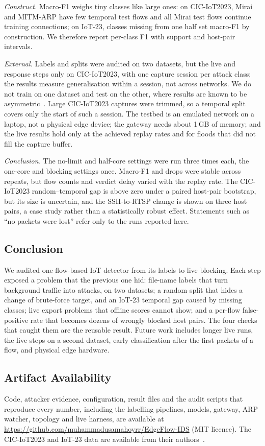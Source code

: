 \emph{Construct.} Macro-F1 weighs tiny classes like large ones: on CIC-IoT2023, Mirai and MITM-ARP have few temporal test flows and all Mirai test flows continue training connections; on IoT-23, classes missing from one half set macro-F1 by construction. We therefore report per-class F1 with support and host-pair intervals.

\emph{External.} Labels and splits were audited on two datasets, but the live and response steps only on CIC-IoT2023, with one capture session per attack class; the results measure generalisation within a session, not across networks. We do not train on one dataset and test on the other, where results are known to be asymmetric~\cite{ali2026siamxbert}. Large CIC-IoT2023 captures were trimmed, so a temporal split covers only the start of such a session. The testbed is an emulated network on a laptop, not a physical edge device; the gateway needs about 1\,GB of memory; and the live results hold only at the achieved replay rates and for floods that did not fill the capture buffer.

\emph{Conclusion.} The no-limit and half-core settings were run three times each, the one-core and blocking settings once. Macro-F1 and drops were stable across repeats, but flow counts and verdict delay varied with the replay rate. The CIC-IoT2023 random--temporal gap is above zero under a paired host-pair bootstrap, but its size is uncertain, and the SSH-to-RTSP change is shown on three host pairs, a case study rather than a statistically robust effect. Statements such as ``no packets were lost'' refer only to the runs reported here.

\subsection{Conclusion}

We audited one flow-based IoT detector from its labels to live blocking. Each step exposed a problem that the previous one hid: file-name labels that turn background traffic into attacks, on two datasets; a random split that hides a change of brute-force target, and an IoT-23 temporal gap caused by missing classes; live export problems that offline scores cannot show; and a per-flow false-positive rate that becomes dozens of wrongly blocked host pairs. The four checks that caught them are the reusable result. Future work includes longer live runs, the live steps on a second dataset, early classification after the first packets of a flow, and physical edge hardware.

\subsection{Artifact Availability}

Code, attacker evidence, configuration, result files and the audit scripts that reproduce every number, including the labelling pipelines, models, gateway, ARP watcher, topology and live harness, are available at \url{https://github.com/muhammadusamahoyrr/EdgeFlow-IDS} (MIT licence). The CIC-IoT2023 and IoT-23 data are available from their authors~\cite{neto2023ciciot2023,garcia2020iot23}.
